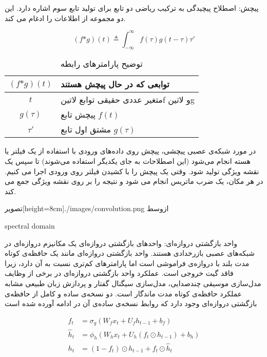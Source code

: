 
پیچش: اصطلاح پیچیدگی به ترکیب ریاضی دو تابع برای تولید تابع سوم اشاره دارد. این دو مجموعه از اطلاعات را ادغام می کند.


\begin{equation}
  \label{eq:base}
(f \text{*} g)(t) \triangleq \int_{-\infty}^\infty f(\tau)g(t - \tau)\tau'
\end{equation}


\begin{table}[h]
  \centering
  \caption{توضیح پارامترهای رابطه }
  \begin{tabular}{|c|p{}|}
    \hline
    $(f \text{*} g)(t)$ & توابعی که در حال پیچش هستند \\
    \hline
    $t$ & متغیر عددی حقیقی توابع ‌لاتین{f}  و ‌لاتین{g} \\
    \hline
    $g(\tau)$ & پیچش تابع $f(t)$ \\
    \hline
    $\tau'$ & مشتق اول تابع $g(\tau)$ \\
    \hline
  \end{tabular}
  \label{tbl:distance}
\end{table}


در مورد شبکه‌ی عصبی پیچشی، پیچش روی داده‌های ورودی با استفاده از یک فیلتر یا هسته انجام می‌شود (این اصطلاحات به جای یکدیگر استفاده می‌شوند) تا سپس یک نقشه ویژگی تولید شود. وقتی یک پیچش را با کشیدن فیلتر روی ورودی اجرا می کنیم. در هر مکان، یک ضرب ماتریس انجام می شود و نتیجه را بر روی نقشه ویژگی جمع می کند.

  ‌تصویر[height=8cm]{./images/convolution.png}
  ‌ازوسط

spectral domain


واحد بازگشتی دروازه‌ای: واحدهای بازگشتی دروازه‌ای یک مکانیزم دروازه‌ای در شبکه‌های عصبی بازرخدادی هستند. واحد بازگشتی دروازه‌ای مانند یک حافظه‌ی کوتاه مدت بلند با دروازه‌ی فراموشی است اما پارامترهای کم‌تری نسبت به  آن دارد، زیرا فاقد گیت خروجی است. عملکرد واحد بازگشتی دروازه‌ای در برخی از وظایف مدل‌سازی موسیقی چندصدایی، مدل‌سازی سیگنال گفتار و پردازش زبان طبیعی مشابه عملکرد حافظه‌ی کوتاه مدت ماندگار است. دو نسخه‌ی ساده و کامل از حافظه‌ی بازگشتی دروازه‌ای وجود دارد که روابط نسخه‌ی ساده‌ی آن در ادامه آورده شده است



\begin{equation}
  \label{eq:base}


{\displaystyle {\begin{aligned}f_{t}&=\sigma _{g}(W_{f}x_{t}+U_{f}h_{t-1}+b_{f})\\{\hat {h}}_{t}&=\phi _{h}(W_{h}x_{t}+U_{h}(f_{t}\odot h_{t-1})+b_{h})\\h_{t}&=(1-f_{t})\odot h_{t-1}+f_{t}\odot {\hat {h}}_{t}\end{aligned}}}



\end{equation}


